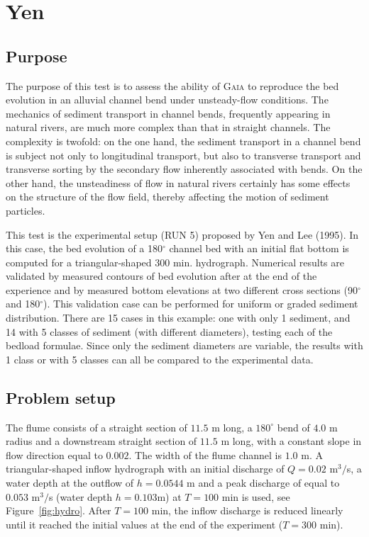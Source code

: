 \chapter{Yen}
%

%
\section{Purpose}
%
The purpose of this test is to assess the ability of \textsc{Gaia} to reproduce the bed evolution in an alluvial channel bend under unsteady-flow conditions.
The mechanics of sediment transport in channel bends, frequently appearing in natural rivers, are much more complex than that in straight channels.
The complexity is twofold: on the one hand, the sediment transport in a channel bend is subject not only to longitudinal transport,
but also to transverse transport and transverse sorting by the secondary flow inherently associated with bends.
On the other hand, the unsteadiness of flow in natural rivers certainly has some effects on the structure of the flow field,
thereby affecting the motion of sediment particles.

This test is the experimental setup (RUN 5) proposed by Yen and Lee (1995).
In this case, the bed evolution of a 180$^{\circ}$ channel bed with an initial flat bottom is computed for a triangular-shaped $300$ min. hydrograph.
Numerical results are validated by measured contours of bed evolution after at the end of the experience and by measured bottom elevations at
two different cross sections (90$^{\circ}$ and 180$^{\circ}$). This validation case can be performed for uniform or graded sediment distribution.
There are 15 cases in this example: one with only 1 sediment, and 14 with 5 classes of sediment (with different diameters), testing each of the bedload formulae.
Since only the sediment diameters are variable, the results with 1 class or with 5 classes can all be compared to the experimental data.
%
\section{Problem setup}
%
The flume consists of a straight section of $11.5$ m long, a $180^{\circ}$ bend of $4.0$ m radius and a downstream straight section of
$11.5$ m long, with a constant slope in flow direction equal to $0.002$. The width of the flume channel is $1.0$ m.
A triangular-shaped inflow hydrograph with an initial discharge of $Q=0.02$ m$^3/$s, a water depth at the outflow of $h = 0.0544$ m
and a peak discharge of equal to $0.053$ m$^3/$s (water depth $h=0.103$m) at $T = 100$ min
is used, see Figure~\ref{fig:hydro}. After $T = 100$ min, the inflow discharge is reduced linearly until
it reached the initial values at the end of the experiment ($T = 300$ min).

